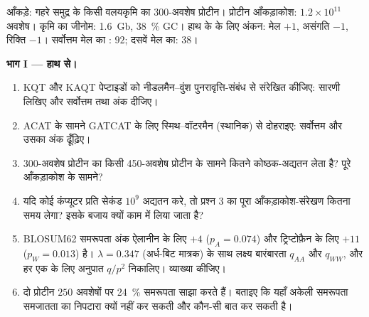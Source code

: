 \begin{problem}
\label{pb:b3:bioinformatics:1}
आँकड़े: गहरे समुद्र के किसी वलयकृमि का \num{300}-अवशेष प्रोटीन। प्रोटीन
आँकड़ाकोश: $1.2\times 10^{11}$ अवशेष। कृमि का जीनोम:
\qty{1.6}{Gb}, \qty{38}{\%} GC। हाथ के  के लिए अंकन: मेल $+1$,
असंगति $-1$, रिक्ति $-1$। सर्वोत्तम  मेल का : $92$; दसवें
मेल का: $38$।

\medskip
\noindent\textbf{भाग I --- हाथ से।}
\begin{enumerate}
  \item KQT और KAQT पेप्टाइडों को नीडलमैन--वुंश
        पुनरावृत्ति-संबंध से संरेखित कीजिए: सारणी लिखिए और सर्वोत्तम
         तथा अंक दीजिए।
  \item ACAT के सामने GATCAT के लिए स्मिथ--वॉटरमैन (स्थानिक) से
        दोहराइए: सर्वोत्तम  और उसका अंक ढूँढ़िए।
  \item \num{300}-अवशेष प्रोटीन का किसी \num{450}-अवशेष प्रोटीन के
        सामने  कितने कोष्ठक-अद्यतन लेता है? पूरे
        आँकड़ाकोश के सामने?
  \item यदि कोई कंप्यूटर प्रति सेकंड $10^{9}$ अद्यतन करे, तो प्रश्न 3
        का पूरा आँकड़ाकोश-संरेखण कितना समय लेगा? इसके बजाय  क्यों
        काम में लिया जाता है?
  \item BLOSUM62 समरूपता अंक ऐलानीन के लिए $+4$ ($p_{A} =
        0.074$) और ट्रिप्टोफ़ैन के लिए $+11$ ($p_{W} = 0.013$) है।
        $\lambda = 0.347$ (अर्ध-बिट मात्रक) के साथ लक्ष्य बारंबारता
        $q_{AA}$ और $q_{WW}$, और हर एक के लिए अनुपात $q/p^{2}$
        निकालिए। व्याख्या कीजिए।
  \item दो प्रोटीन $250$ अवशेषों पर \qty{24}{\%} समरूपता साझा करते हैं।
        बताइए कि यहाँ अकेली समरूपता समजातता का निपटारा क्यों नहीं कर
        सकती और कौन-सी बात कर सकती है।
\end{enumerate}


\end{problem}
